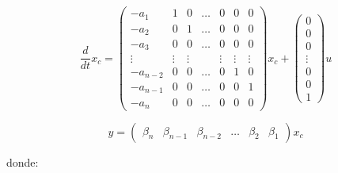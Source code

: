         \begin{equation}
            \frac{d}{dt} x_c =
            \begin{pmatrix}
            -a_{1} & 1 & 0 & \dots & 0 & 0 & 0 \\
            -a_{2} & 0 & 1 & \dots & 0 & 0 & 0 \\
            -a_{3} & 0 & 0 & \dots & 0 & 0 & 0 \\
            \vdots & \vdots & \vdots & & \vdots & \vdots & \vdots \\
            -a_{n-2} & 0 & 0 & \dots & 0 & 1 & 0 \\
            -a_{n-1} & 0 & 0 & \dots & 0 & 0 & 1 \\
            -a_{n} & 0 & 0 & \dots & 0 & 0 & 0
            \end{pmatrix} x_c +
            \begin{pmatrix}
            0 \\
            0 \\
            0 \\
            \vdots \\
            0 \\
            0 \\
            1
            \end{pmatrix} u
        \end{equation}

        \begin{equation}
            y =
            \begin{pmatrix}
                \beta_n & \beta_{n-1} & \beta_{n-2} & \dots & \beta_2 & \beta_1
            \end{pmatrix} x_c
        \end{equation}

        donde:

